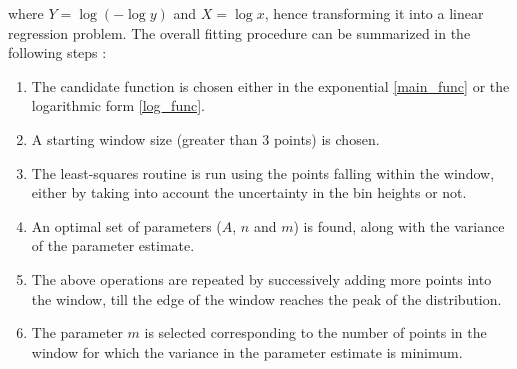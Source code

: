 where $Y = \log(-\log y)$ and $X = \log x$, hence transforming it into a linear regression problem.
The overall fitting procedure can be summarized in the following steps : 

\begin{enumerate}
	\item The candidate function is chosen either in the exponential \eqref{main_func}
		or the logarithmic form \eqref{log_func}.
	\item A starting window size (greater than 3 points) is chosen.
	\item The least-squares routine is run using the points falling within the window,
		either by taking into account the uncertainty in the bin heights or not.
	\item An optimal set of parameters ($A$, $n$ and $m$) is found, along with the variance
		of the parameter estimate. 
	\item The above operations are repeated by successively adding more points into the window,
		till the edge of the window reaches the peak of the distribution. 
	\item The parameter $m$ is selected corresponding to the number of points in the window 
		for which the variance in the parameter estimate is minimum. 
\end{enumerate}


